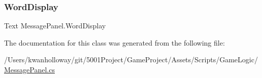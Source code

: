 \subsubsection{\texorpdfstring{Word\+Display}{WordDisplay}}
{\footnotesize\ttfamily Text Message\+Panel.\+Word\+Display}



The documentation for this class was generated from the following file\+:\begin{DoxyCompactItemize}
\item 
/\+Users/kwanholloway/git/5001\+Project/\+Game\+Project/\+Assets/\+Scripts/\+Game\+Logic/\hyperlink{_message_panel_8cs}{Message\+Panel.\+cs}\end{DoxyCompactItemize}
